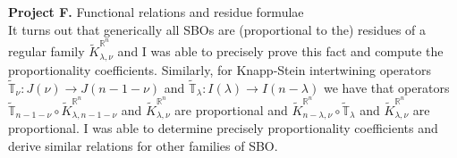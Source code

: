\documentclass[11pt,a4paper,twoside]{jarticle}
\newcommand{\研究課題名}{Symmetry breaking operators}
\newcommand{\研究機関名}{東京大学}
\newcommand{\申請者氏名}{レオンチエフ\,オレクシィ}
\newcommand{\研究代表者氏名}{\申請者氏名}
\newcommand{\研究期間の最終元号年度}{31}	%
\begin{document}
{	\textbf{Project F.} Functional relations and residue formulae\\
	It turns out that generically all SBOs are (proportional to the) residues of a regular family $\tilde{K}_{\lambda,\nu}^{\mathbb{R}^n}$
	and I was able to precisely prove this fact and compute the proportionality coefficients.
	Similarly, for Knapp-Stein intertwining operators $\tilde{\mathbb{T}}_\nu:J(\nu)\to J(n-1-\nu)$ and $\tilde{\mathbb{T}}_\lambda:I(\lambda)\to I(n-\lambda)$
	we have that operators $\tilde{\mathbb{T}}_{n-1-\nu}\circ \tilde{K}_{\lambda,n-1-\nu}^{\mathbb{R}^n}$ and $\tilde{K}_{\lambda,\nu}^{\mathbb{R}^n}$ are proportional
	and $\tilde{K}_{n-\lambda,\nu}^{\mathbb{R}^n}\circ \tilde{\mathbb{T}}_\lambda$ and $\tilde{K}_{\lambda,\nu}^{\mathbb{R}^n}$ are proportional. I was able to determine precisely
	proportionality coefficients and derive similar relations for other families of SBO.
}

\end{document}
